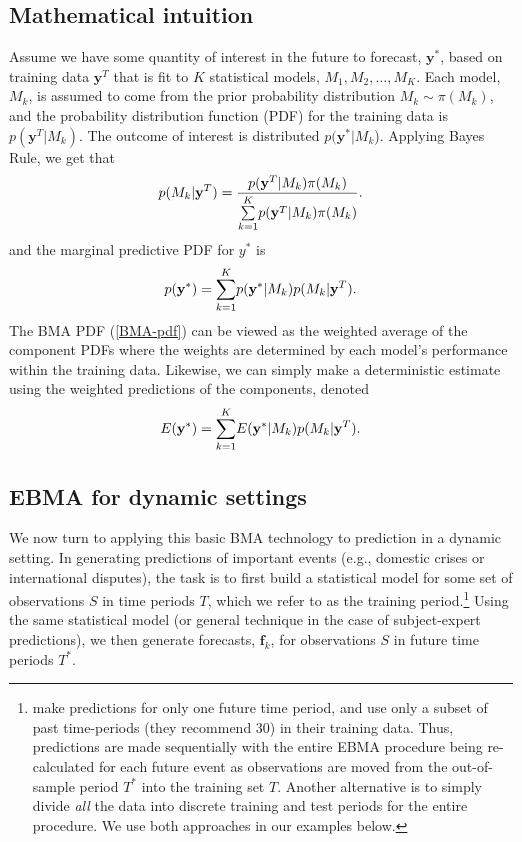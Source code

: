 \documentclass[pdftex,12pt,fullpage,oneside]{amsart}
\begin{document}
\subsection{Mathematical intuition}
Assume we have some quantity of interest in the future to forecast,
$\mathbf{y}^*$, based on training data $\mathbf{y}^T$ that is fit to
$K$ statistical models, $M_1, M_2, \ldots, M_K$. Each model, $M_k$, is
assumed to come from the prior probability distribution $M_k\sim
\pi(M_k)$, and the probability distribution function (PDF) for the
training data is $p(\mathbf{y}^T|M_k)$. The outcome of interest is
distributed $p(\mathbf{y}^*|M_k$).  Applying Bayes Rule, we get that
\begin{equation} \small
p(M_k|\mathbf{y}^T) = \frac{p(\mathbf{y}^T|M_k)\pi(M_k)}{\underset{k=1}{\overset{K}{\sum}}p(\mathbf{y}^T|M_k)\pi(M_k)}.
\end{equation}
\noindent and the marginal predictive PDF for $y^*$ is
\begin{equation}
\label{BMA-pdf}
\small
p(\mathbf{y}^*) = \underset{k=1}{\overset{K}{\sum}} p(\mathbf{y}^*|M_k)p(M_k|\mathbf{y}^T).
\end{equation}
The BMA PDF (\ref{BMA-pdf}) can be viewed as the weighted average of
the component PDFs where the weights are determined by each model's
performance within the training data.  Likewise, we can simply make a
deterministic estimate using the weighted predictions of the
components, denoted
\begin{equation} \small
E(\mathbf{y}^*) = \underset{k=1}{\overset{K}{\sum}} E(\mathbf{y}^*|M_k)p(M_k|\mathbf{y}^T).
\end{equation}

\subsection{EBMA for dynamic settings}

We now turn to applying this basic BMA technology to prediction in a
dynamic setting.  In generating predictions of important events (e.g.,
domestic crises or international disputes), the task is to first build
a statistical model for some set of observations $S$ in time periods
$T$, which we refer to as the training
period.\footnote{\citet{Sloughter:2007} make predictions for only one
  future time period, and use only a subset of past time-periods (they
  recommend 30) in their training data. Thus, predictions are made
  sequentially with the entire EBMA procedure being re-calculated for
  each future event as observations are moved from the out-of-sample
  period $T^*$ into the training set $T$. Another alternative is to
  simply divide \textit{all} the data into discrete training and test
  periods for the entire procedure.  We use both approaches in our
  examples below.}  Using the same statistical model (or general
technique in the case of subject-expert predictions), we then generate
forecasts, $\mathbf{f}_k$, for observations $S$ in future time periods
$T^*$.
\end{document}
